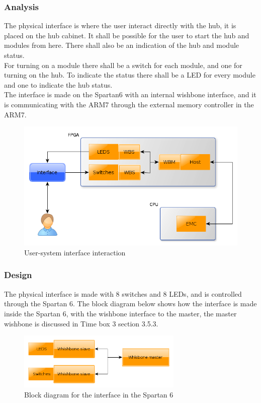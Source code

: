\subsubsection{Analysis}
The physical interface is where the user interact directly with the hub, it is placed on the hub cabinet. It shall be possible for the user to start the hub and modules from here. There shall also be an indication of the hub and module status.\\
For turning on a module there shall be a switch for each module, and one for turning on the hub. To indicate the status there shall be a LED for every module and one to indicate the hub status.\\
The interface is made on the Spartan6 with an internal wishbone interface, and it is communicating with the ARM7 through the external memory controller in the ARM7.
\begin{figure}[H]
	\begin{centering}
		\includegraphics[width=1.0\textwidth]{images/analysis_phy_interface.png}
		\caption{User-system interface interaction}
	\end{centering}
\end{figure}
\subsubsection{Design}
The physical interface is made with 8 switches and 8 LEDs, and is controlled through the Spartan 6. The block diagram below shows how the interface is made inside the Spartan 6, with the wishbone interface to the master, the master wishbone is discussed in Time box 3 section 3.5.3.
\begin{figure}[H]
	\begin{centering}
			\includegraphics[width=0.7\textwidth]{images/Design_HWmodule.png}
			\caption{Block diagram for the interface in the Spartan 6}
	\end{centering}
\end{figure}
